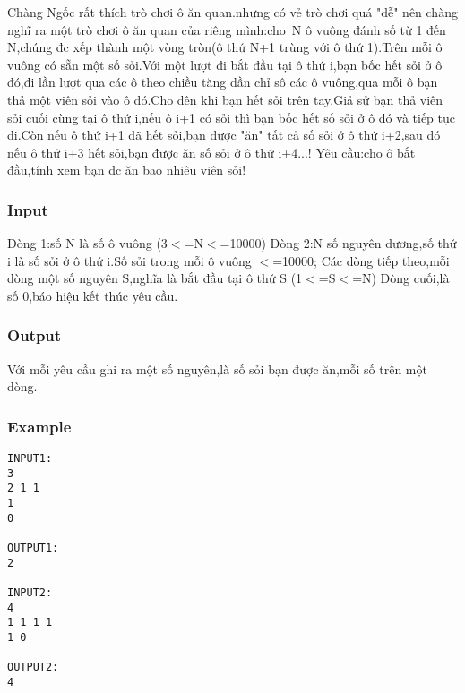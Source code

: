 

Chàng Ngốc rất thích trò chơi ô ăn quan.nhưng có vẻ trò chơi quá "dễ" nên chàng nghĩ ra một trò chơi ô ăn quan của riêng mình:cho N ô vuông đánh số từ 1 đến N,chúng đc xếp thành một vòng tròn(ô thứ N+1 trùng với ô thứ 1).Trên mỗi ô vuông có sẵn một số sỏi.Với một lượt đi bắt đầu tại ô thứ i,bạn bốc hết sỏi ở ô đó,đi lần lượt qua các ô theo chiều tăng dần chỉ sô các ô vuông,qua mỗi ô bạn thả một viên sỏi vào ô đó.Cho đên khi bạn hết sỏi trên tay.Giả sử bạn thả viên sỏi cuối cùng tại ô thứ i,nếu ô i+1 có sỏi thì bạn bốc hết số sỏi ở ô đó và tiếp tục đi.Còn nếu ô thứ i+1 đã hết sỏi,bạn được "ăn" tất cả số sỏi ở ô thứ i+2,sau đó nếu ô thứ i+3 hết sỏi,bạn được ăn số sỏi ở ô thứ i+4...! Yêu cầu:cho ô bắt đầu,tính xem bạn dc ăn bao nhiêu viên sỏi!

\subsubsection{Input}

Dòng 1:số N là số ô vuông (3$<$=N$<$=10000) Dòng 2:N số nguyên dương,số thứ i là số sỏi ở ô thứ i.Số sỏi trong mỗi ô vuông $<$=10000; Các dòng tiếp theo,mỗi dòng một số nguyên S,nghĩa là bắt đầu tại ô thứ S (1$<$=S$<$=N) Dòng cuối,là số 0,báo hiệu kết thúc yêu cầu.

\subsubsection{Output}

Với mỗi yêu cầu ghi ra một số nguyên,là số sỏi bạn được ăn,mỗi số trên một dòng.

\subsubsection{Example}
\begin{verbatim}
INPUT1:
3
2 1 1
1
0

OUTPUT1:
2

INPUT2:
4
1 1 1 1
1 0

OUTPUT2:
4\end{verbatim}